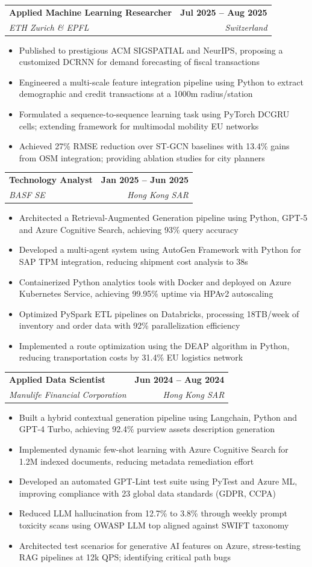 \documentclass[letterpaper,11.9pt]{article}
\makeatletter
\newcommand{\resumeItem}[1]{
  \item\small{
    {#1 \vspace{-2pt}}
  }
}
\newcommand{\resumeSubheading}[4]{
  \vspace{-2pt}\item
    \begin{tabular*}{1.0\textwidth}[t]{l@{\extracolsep{\fill}}r}
      \textbf{#1} & \textbf{\small #2} \\
      \textit{\small#3} & \textit{\small #4} \\
    \end{tabular*}\vspace{-7pt}
}
\newcommand{\resumeItemListStart}{\begin{itemize}}
\newcommand{\resumeItemListEnd}{\end{itemize}\vspace{-5pt}}
\makeatother
\begin{document}
\resumeSubheading
  {Applied Machine Learning Researcher}{Jul 2025 -- Aug 2025}
  {ETH Zurich \& EPFL}{Switzerland}
  \resumeItemListStart
    \vspace{1pt}
    \resumeItem{Published to prestigious ACM SIGSPATIAL and NeurIPS, proposing a customized DCRNN for demand forecasting of fiscal transactions}
    \resumeItem{Engineered a multi-scale feature integration pipeline using Python to extract demographic and credit transactions at a 1000m radius/station}
    \resumeItem{Formulated a sequence-to-sequence learning task using PyTorch DCGRU cells;  extending framework for multimodal mobility EU networks}
    \resumeItem{Achieved 27\% RMSE reduction over ST-GCN baselines with 13.4\% gains from OSM integration; providing ablation studies for city planners}
  \resumeItemListEnd
    \vspace{1pt}
\resumeSubheading
  {Technology Analyst}{Jan 2025 -- Jun 2025}
  {BASF SE}{Hong Kong SAR}
  \resumeItemListStart
    \resumeItem{Architected a Retrieval-Augmented Generation pipeline using Python, GPT-5 and Azure Cognitive Search, achieving 93\% query accuracy}
    \resumeItem{Developed a multi-agent system using AutoGen Framework with Python for SAP TPM integration, reducing shipment cost analysis to 38s}
    \resumeItem{Containerized Python analytics tools with Docker and deployed on Azure Kubernetes Service, achieving 99.95\% uptime via HPAv2 autoscaling}
    \resumeItem{Optimized PySpark ETL pipelines on Databricks, processing 18TB/week of inventory and order data with 92\% parallelization efficiency}
    \resumeItem{Implemented a route optimization using the DEAP algorithm in Python, reducing transportation costs by 31.4\% EU logistics network}
  \resumeItemListEnd

    \vspace{3pt}

\resumeSubheading
  {Applied Data Scientist}{Jun 2024 -- Aug 2024}
  {Manulife Financial Corporation}{Hong Kong SAR}
  \resumeItemListStart
    \resumeItem{Built a hybrid contextual generation pipeline using Langchain, Python and GPT-4 Turbo, achieving 92.4\% purview assets description generation}
    \resumeItem{Implemented dynamic few-shot learning with Azure Cognitive Search for 1.2M indexed documents, reducing metadata remediation effort}
    \resumeItem{Developed an automated GPT-Lint test suite using PyTest and Azure ML, improving compliance with 23 global data standards (GDPR, CCPA)}
    \resumeItem{Reduced LLM hallucination from 12.7\% to 3.8\% through weekly prompt toxicity scans using OWASP LLM top aligned against SWIFT taxonomy}
    \resumeItem{Architected test scenarios for generative AI features on Azure, stress-testing RAG pipelines at 12k QPS; identifying critical path bugs}
  \resumeItemListEnd
    \vspace{3pt}
\end{document}
